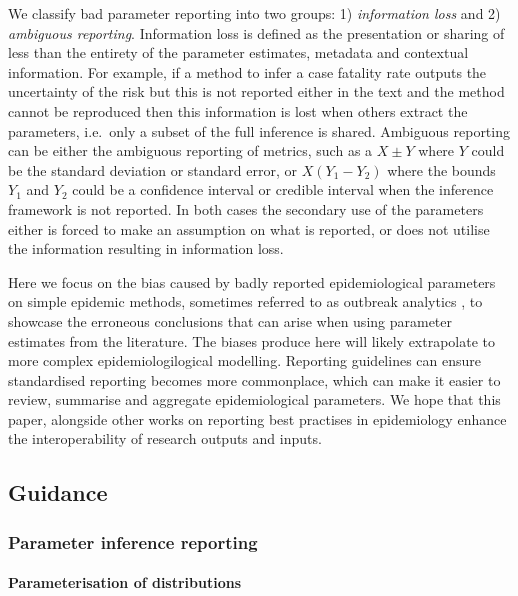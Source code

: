 \documentclass[
  10pt,
  letterpaper,
]{article}
\begin{document}
We classify bad parameter reporting into two groups: 1)
\emph{information loss} and 2) \emph{ambiguous reporting}. Information
loss is defined as the presentation or sharing of less than the entirety
of the parameter estimates, metadata and contextual information. For
example, if a method to infer a case fatality rate outputs the
uncertainty of the risk but this is not reported either in the text and
the method cannot be reproduced then this information is lost when
others extract the parameters, i.e.~only a subset of the full inference
is shared. Ambiguous reporting can be either the ambiguous reporting of
metrics, such as a \(X \pm Y\) where \(Y\) could be the standard
deviation or standard error, or \(X (Y_1 - Y_2)\) where the bounds
\(Y_1\) and \(Y_2\) could be a confidence interval or credible interval
when the inference framework is not reported. In both cases the
secondary use of the parameters either is forced to make an assumption
on what is reported, or does not utilise the information resulting in
information loss.

Here we focus on the bias caused by badly reported epidemiological
parameters on simple epidemic methods, sometimes referred to as outbreak
analytics \citep[sensu][]{polonskyOutbreakAnalyticsDeveloping2019}, to
showcase the erroneous conclusions that can arise when using parameter
estimates from the literature. The biases produce here will likely
extrapolate to more complex epidemiologilogical modelling. Reporting
guidelines can ensure standardised reporting becomes more commonplace,
which can make it easier to review, summarise and aggregate
epidemiological parameters. We hope that this paper, alongside other
works on reporting best practises in epidemiology
\citep{pollettRecommendedReportingItems2021, charnigaBestPracticesEstimating2024}
enhance the interoperability of research outputs and inputs.

\subsection{Guidance}\label{guidance}

\subsubsection{Parameter inference
reporting}\label{parameter-inference-reporting}

\paragraph{Parameterisation of
distributions}\label{parameterisation-of-distributions}
\end{document}
